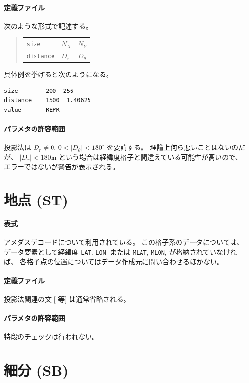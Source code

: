 \paragraph{定義ファイル}
次のような形式で記述する。

\begin{quote}
\begin{tabular}{lll}
{\tt size} & $N_X$ & $N_Y$ \\
{\tt distance} & $D_r$ & $D_\theta$ \\
\end{tabular}
\end{quote}

具体例を挙げると次のようになる。

\begin{screen}
\begin{verbatim}
size        200  256
distance    1500  1.40625
value       REPR
\end{verbatim}
\end{screen}

\paragraph{パラメタの許容範囲}
投影法は
\(D_r \ne 0\),
\(0 < |D_\theta| < 180^\circ\)
を要請する。
理論上何ら悪いことはないのだが、
\(|D_r| < 180\)m
という場合は経緯度格子と間違えている可能性が高いので、
エラーではないが警告が表示される。


\section{地点 (ST)}
\paragraph{表式}
アメダスデコードについて利用されている。
この格子系のデータについては、
データ要素として経緯度
{\tt LAT},
{\tt LON},
または
{\tt MLAT},
{\tt MLON},
が格納されていなければ、
各格子点の位置についてはデータ作成元に問い合わせるほかない。
\paragraph{定義ファイル}
投影法関連の文 [ 等] は通常省略される。
\paragraph{パラメタの許容範囲}
特段のチェックは行われない。

\section{細分 (SB)}

